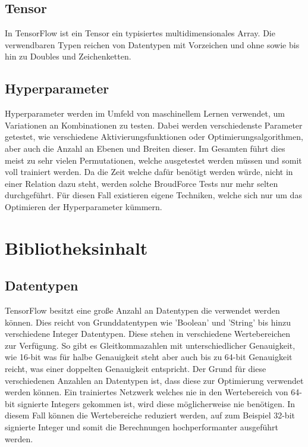 \subsection{Tensor}

In TensorFlow ist ein Tensor ein typisiertes multidimensionales Array. 
Die verwendbaren Typen reichen von Datentypen mit Vorzeichen und ohne sowie bis hin zu Doubles und Zeichenketten. \cite{wp2015tensorflow} 

\subsection{Hyperparameter} 

Hyperparameter werden im Umfeld von maschinellem Lernen verwendet, um Variationen an Kombinationen zu testen. 
Dabei werden verschiedenste Parameter getestet, wie verschiedene Aktivierungsfunktionen oder Optimierungsalgorithmen, aber auch die Anzahl an Ebenen und Breiten dieser. 
Im Gesamten führt dies meist zu sehr vielen Permutationen, welche ausgetestet werden müssen und somit voll trainiert werden. 
Da die Zeit welche dafür benötigt werden würde, nicht in einer Relation dazu steht, werden solche BroudForce Tests nur mehr selten durchgeführt. 
Für diesen Fall existieren eigene Techniken, welche sich nur um das Optimieren der Hyperparameter kümmern. \cite{bishop2006pattern}

\section{Bibliotheksinhalt}

\subsection{Datentypen}

TensorFlow besitzt eine große Anzahl an Datentypen die verwendet werden können. 
Dies reicht von Grunddatentypen wie 'Boolean' und 'String' bis hinzu verschiedene Integer Datentypen. 
Diese stehen in verschiedene Wertebereichen zur Verfügung. 
So gibt es Gleitkommazahlen mit unterschiedlicher Genauigkeit, wie 16-bit was für halbe Genauigkeit steht aber auch bis zu 64-bit Genauigkeit reicht, was einer doppelten Genauigkeit entspricht. 
Der Grund für diese verschiedenen Anzahlen an Datentypen ist, dass diese zur Optimierung verwendet werden können. 
Ein trainiertes Netzwerk welches nie in den Wertebereich von 64-bit signierte Integers gekommen ist, wird diese möglicherweise nie benötigen. 
In diesem Fall können die Wertebereiche reduziert werden, auf zum Beispiel 32-bit signierte Integer und somit die Berechnungen hochperformanter ausgeführt werden. \cite{TensorFlow}

